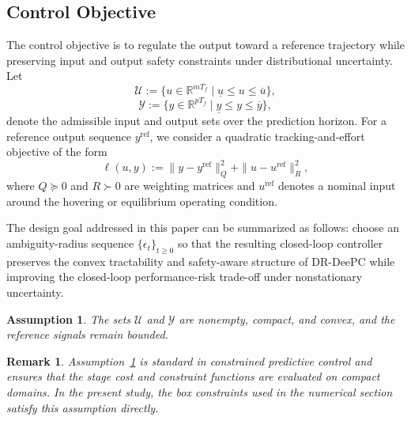 \documentclass[conference]{IEEEtran}
\newtheorem{assumption}{Assumption}
\newtheorem{remark}{Remark}
\begin{document}
\subsection{Control Objective}
The control objective is to regulate the output toward a reference trajectory while preserving input and output safety constraints under distributional uncertainty. Let
\begin{equation}
\mathcal{U}:=\{u \in \mathbb{R}^{mT_f}\mid \underline{u}\le u\le \overline{u}\},
\end{equation}
\begin{equation}
\mathcal{Y}:=\{y \in \mathbb{R}^{pT_f}\mid \underline{y}\le y\le \overline{y}\},
\end{equation}
denote the admissible input and output sets over the prediction horizon. For a reference output sequence $y^{\mathrm{ref}}$, we consider a quadratic tracking-and-effort objective of the form
\begin{equation}
\ell(u,y)
:=
\|y-y^{\mathrm{ref}}\|_{Q}^{2}
 + \|u-u^{\mathrm{ref}}\|_{R}^{2},
\end{equation}
where $Q\succeq 0$ and $R\succ 0$ are weighting matrices and $u^{\mathrm{ref}}$ denotes a nominal input around the hovering or equilibrium operating condition.

The design goal addressed in this paper can be summarized as follows: choose an ambiguity-radius sequence $\{\epsilon_t\}_{t\ge0}$ so that the resulting closed-loop controller preserves the convex tractability and safety-aware structure of DR-DeePC while improving the closed-loop performance-risk trade-off under nonstationary uncertainty.

\begin{assumption}
\label{ass:compact}
The sets $\mathcal{U}$ and $\mathcal{Y}$ are nonempty, compact, and convex, and the reference signals remain bounded.
\end{assumption}

\begin{remark}
Assumption~\ref{ass:compact} is standard in constrained predictive control and ensures that the stage cost and constraint functions are evaluated on compact domains. In the present study, the box constraints used in the numerical section satisfy this assumption directly.
\end{remark}
\end{document}
